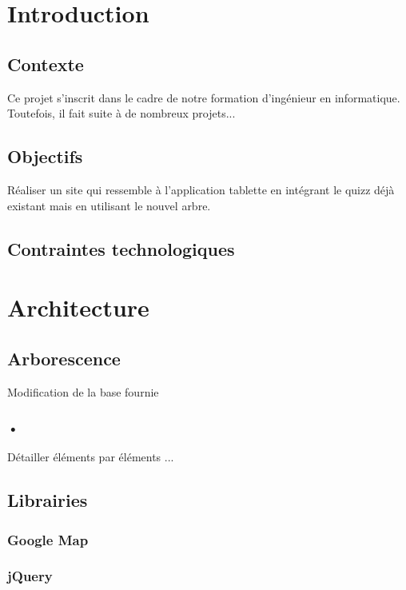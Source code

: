 \documentclass[twoside]{EPURapport}
\begin{document}
\chapter{Introduction}

	\section{Contexte}
	
	Ce projet s'inscrit dans le cadre de notre formation d'ingénieur en informatique. Toutefois, il fait suite à de nombreux projets...
	
	\section{Objectifs}
	
	Réaliser un site qui ressemble à l'application tablette en intégrant le quizz déjà existant mais en utilisant le nouvel arbre.
	
	\section{Contraintes technologiques}

\chapter{Architecture}

	\section{Arborescence}
	
	Modification de la base fournie
	
		\subsection{•}
		
		Détailler éléments par éléments ...
	
	\section{Librairies}
		
		\subsection{Google Map}
		
		\subsection{jQuery}
		
\end{document}
